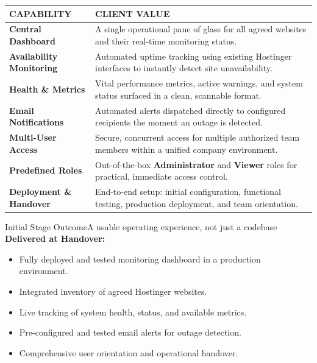 \documentclass[11pt,a4paper]{article}
\newcommand{\thd}[1]{\textsc{\bfseries\color{white}\fontsize{8.6}{8.6}\selectfont #1}}
\begin{document}
\renewcommand{\arraystretch}{1.7}
\noindent
\begin{longtable}{@{}>{\raggedright\arraybackslash}p{0.28\linewidth}p{0.72\linewidth}@{}}
\rowcolor{navy}
\thd{CAPABILITY} & \thd{CLIENT VALUE} \\
\midrule
\endhead %
\textbf{Central Dashboard} & A single operational pane of glass for all agreed websites and their real-time monitoring status. \\
\rowcolor{tabletint}
\textbf{Availability Monitoring} & Automated uptime tracking using existing Hostinger interfaces to instantly detect site unavailability. \\
\textbf{Health \& Metrics} & Vital performance metrics, active warnings, and system status surfaced in a clean, scannable format. \\
\rowcolor{tabletint}
\textbf{Email Notifications} & Automated alerts dispatched directly to configured recipients the moment an outage is detected. \\
\textbf{Multi-User Access} & Secure, concurrent access for multiple authorized team members within a unified company environment. \\
\rowcolor{tabletint}
\textbf{Predefined Roles} & Out-of-the-box \textbf{Administrator} and \textbf{Viewer} roles for practical, immediate access control. \\
\textbf{Deployment \& Handover} & End-to-end setup: initial configuration, functional testing, production deployment, and team orientation. \\
\bottomrule
\end{longtable}

\vspace{2em}

\begin{recbox}{Initial Stage Outcome}{A usable operating experience, not just a codebase}
\textbf{Delivered at Handover:}
\begin{itemize}
  \item Fully deployed and tested monitoring dashboard in a production environment.
  \item Integrated inventory of agreed Hostinger websites.
  \item Live tracking of system health, status, and available metrics.
  \item Pre-configured and tested email alerts for outage detection.
  \item Comprehensive user orientation and operational handover.
\end{itemize}
\end{recbox}
\end{document}

